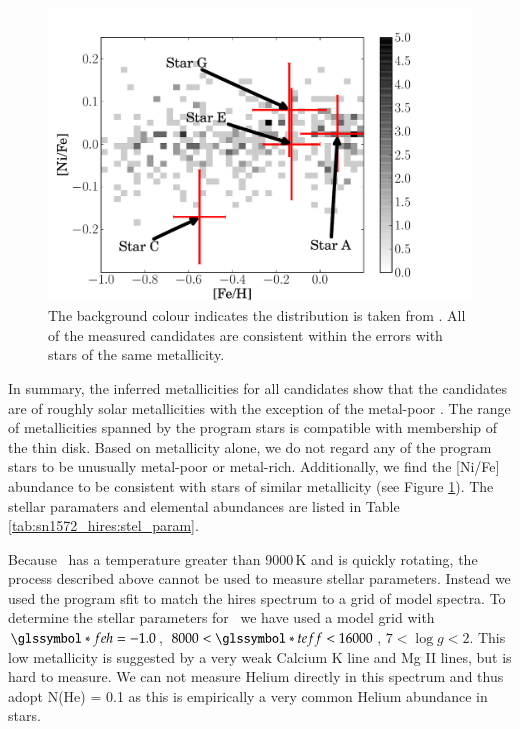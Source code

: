 \begin{figure}[tb] %
   \centering
   \includegraphics[width=1\textwidth, trim=0 0 3cm 0, clip]{chapter_sn1572_hires/plots/abund_chiaki.pdf} 
   \caption[Comparison of nickel and iron abundance measurement of stars in SN 1572]{The background colour indicates the distribution is taken from \citet{2006ApJ...653.1145K}. All of the measured candidates are consistent within the errors with stars of the same metallicity.}
   \label{fig:kobayashi06}
\end{figure}

In summary, the inferred metallicities for all candidates show that the candidates are of roughly solar metallicities with the exception of the metal-poor \starc. The range of metallicities spanned by the program stars is compatible with membership of the thin disk. Based on metallicity alone, we do not regard any of the program stars to be unusually metal-poor or metal-rich.  Additionally, we find the [Ni/Fe] abundance to be consistent with stars of similar metallicity (see Figure \ref{fig:kobayashi06}). The stellar paramaters and elemental abundances are listed in Table \ref{tab:sn1572_hires:stel_param}.

Because \starb\ has a temperature  greater than 9000\,K and is quickly rotating, the process described above cannot be used to measure stellar parameters. Instead we used the program \gls{sfit} to match the \gls{hires} spectrum to a grid of model spectra. To determine the stellar parameters for \starb\ we have used a model grid with $\feh= -1.0$, $8000 < \teff < 16000$, $7 < \log{g} < 2$. This low metallicity is suggested by a very weak Calcium K line and Mg II lines, but is hard to measure. We can not measure Helium directly in this spectrum and thus adopt N(He) = 0.1 as this is empirically a very common Helium abundance in stars.

